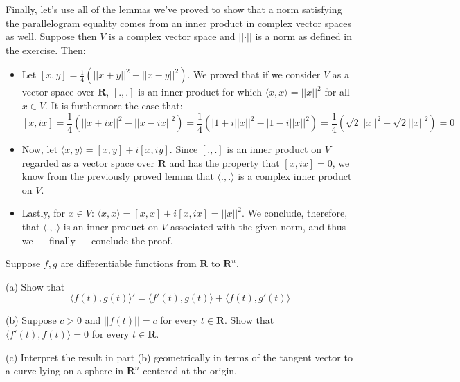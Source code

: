 \begin{solution}
Finally, let's use all of the lemmas we've proved to show that a norm satisfying the parallelogram equality comes from an inner product in complex vector spaces as well. Suppose then $V$ is a complex vector space and $\lvert \lvert \cdot \rvert \rvert$ is a norm as defined in the exercise. Then:
\begin{itemize}
    \item Let $[x, y] = \frac{1}{4}(\lvert \lvert x + y \rvert \rvert^2 - \lvert \lvert x - y \rvert \rvert^2)$. We proved that if we consider $V$ as a vector space over $\mathbf{R}$, $ [., .]$ is an inner product for which $\langle x, x \rangle = \lvert \lvert x \rvert \rvert^2$ for all $x \in V$. It is furthermore the case that:
    $$[x, ix] = \frac{1}{4}(\lvert \lvert x + ix \rvert \rvert^2 - \lvert \lvert x - ix \rvert \rvert^2) = \frac{1}{4}(\lvert 1 + i \lvert \lvert x \rvert \rvert^2 - \lvert 1 - i \lvert \lvert x \rvert \rvert^2) = \frac{1}{4}(\sqrt{2}\lvert \lvert x \rvert \rvert^2 - \sqrt{2} \lvert \lvert x \rvert \rvert^2) = 0$$
    \item Now, let $\langle x, y \rangle = [x, y] + i[x, iy]$. Since $[., .]$ is an inner product on $V$ regarded as a vector space over $\mathbf{R}$ and has the property that $[x, ix] = 0$, we know from the previously proved lemma that $\langle., .\rangle$ is a complex inner product on $V$.
    \item Lastly, for $x \in V$: $\langle x, x \rangle  = [x, x] + i[x, ix] = \lvert \lvert x \rvert \rvert^2$. We conclude, therefore, that $\langle ., .\rangle$ is an inner product on $V$ associated with the given norm, and thus we --- finally --- conclude the proof.
\end{itemize}
\end{solution}

\begin{exercise}{26}
Suppose $f, g$ are differentiable functions from $\mathbf{R}$ to $\mathbf{R}^n$.

(a) Show that $$\langle f(t), g(t) \rangle' = \langle f'(t), g(t) \rangle + \langle f(t), g'(t) \rangle$$

(b) Suppose $c > 0$ and $\lvert \lvert f(t) \rvert \rvert = c$ for every $t \in \mathbf{R}$. Show that $\langle f'(t), f(t) \rangle = 0$ for every $t \in \mathbf{R}$.

(c) Interpret the result in part (b) geometrically in terms of the tangent vector to a curve lying on a sphere in $\mathbf{R}^n$ centered at the origin.
\end{exercise}

